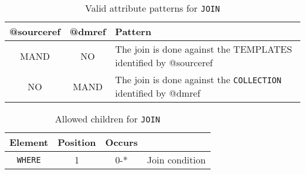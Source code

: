 \begin{table}[!htbp]
\small
\centering
\begin{tabulary}{\linewidth}{|c|c|J|}
    \hline 
        \textbf{@sourceref } &
        \textbf{@dmref} &
        \textbf{Pattern}\\
    \hline      \hline  
        MAND &           
        NO &           
        The join is done against the TEMPLATES identified by @sourceref  \\  
    \hline   
        NO &           
        MAND &           
        The join is done against the \texttt{COLLECTION} identified by @dmref \\
   \hline 
\end{tabulary}
     \caption{Valid attribute patterns for  \texttt{JOIN}}
     \label{tbl:join-pattern}
\end{table}


\begin{table}[!htbp]
\small
\centering
\begin{tabulary}{\linewidth}{|c |c |c|J|}
    \hline 
        \textbf{Element} &
        \textbf{Position} &
        \textbf{Occurs} &
        \\
    \hline      \hline  
        \texttt{WHERE}  &        
        1 &           
        0-* &
         Join condition\\
    \hline 
\end{tabulary}
     \caption{Allowed children for \texttt{JOIN}} 
     \label{tbl:join-chidlren}
 \end{table}
